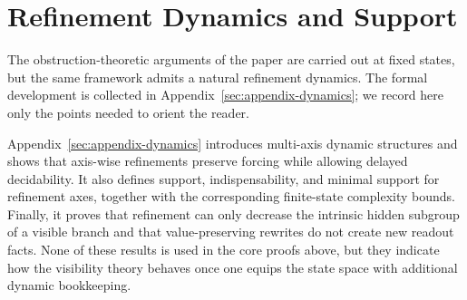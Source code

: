\section{Refinement Dynamics and Support}\label{sec:refinement-dynamics-overview}

The obstruction-theoretic arguments of the paper are carried out at fixed states, but the same framework admits a natural refinement dynamics. The formal development is collected in Appendix~\ref{sec:appendix-dynamics}; we record here only the points needed to orient the reader.

Appendix~\ref{sec:appendix-dynamics} introduces multi-axis dynamic structures and shows that axis-wise refinements preserve forcing while allowing delayed decidability. It also defines support, indispensability, and minimal support for refinement axes, together with the corresponding finite-state complexity bounds. Finally, it proves that refinement can only decrease the intrinsic hidden subgroup of a visible branch and that value-preserving rewrites do not create new readout facts. None of these results is used in the core proofs above, but they indicate how the visibility theory behaves once one equips the state space with additional dynamic bookkeeping.
